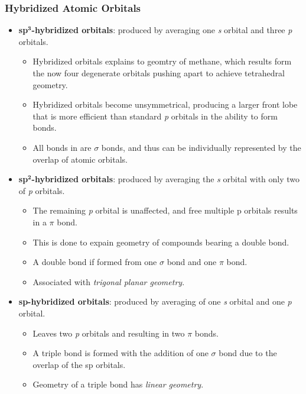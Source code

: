 \documentclass[12pt,a4paper]{article}
\begin{document}
\begin{itemize}
    \subsubsection{Hybridized Atomic Orbitals}
\begin{itemize}
    \item \textbf{sp\(\bm{^3}\)-hybridized orbitals}: produced by averaging one \textit{s} orbital and {\color{o-Sun}three} \textit{p} orbitals.
        \begin{itemize}
            \item Hybridized orbitals explains to geomtry of methane, which results form the {\color{o-Sun}now four degenerate} orbitals pushing apart to achieve tetrahedral geometry.
            \item Hybridized orbitals become {\color{o-Sun}unsymmetrical}, producing a larger front lobe that is more efficient than standard \textit{p} orbitals in the ability to form bonds.
            \item All bonds in are {\color{o-Sun}$\sigma$ bonds}, and thus can be individually represented by the overlap of atomic orbitals.
        \end{itemize}
    \item \textbf{sp\(\bm{^2}\)-hybridized orbitals}: produced by averaging the \textit{s} orbital with only {\color{o-Sun}two} of \textit{p} orbitals.
        \begin{itemize}
            \item The remaining \textit{p} orbital is unaffected, and free multiple p orbitals results in a $\pi$ bond.
            \item This is done to expain geometry of compounds bearing a double bond.
            \item A double bond if formed from one $\sigma$ bond and one $\pi$ bond.
            \item Associated with \textit{trigonal planar geometry}.
        \end{itemize}
    \item \textbf{sp-hybridized orbitals}: produced by averaging of one \textit{s} orbital and {\color{o-Sun}one} \textit{p} orbital.
        \begin{itemize}
            \item Leaves two \textit{p} orbitals and resulting in two $\pi$ bonds.
            \item A triple bond is formed with the addition of one $\sigma$ bond due to the overlap of the sp orbitals.
            \item Geometry of a triple bond has \textit{linear geometry}.

\end{itemize}
\end{itemize}
\end{itemize}
\end{document}
